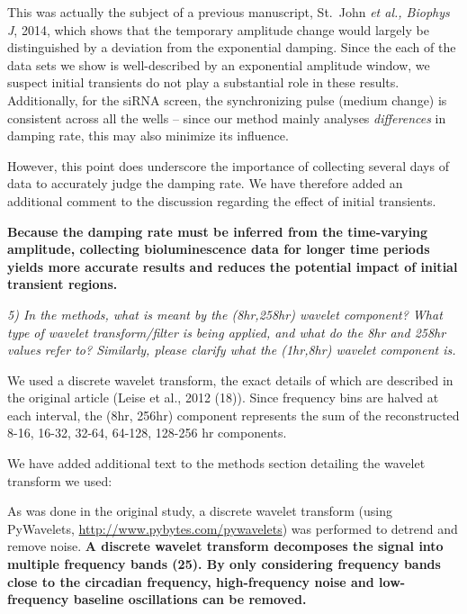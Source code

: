\documentclass[11pt, letterpaper]{article}
\newenvironment{reviewer}{\itshape\color{gray}}{}
\newenvironment{manuscript}[1]{\begin{center}\begin{tcolorbox}[colback=green!5!white,colframe=green!75!black,width=\textwidth,title={#1},breakable,fonttitle=\bfseries]}{\end{tcolorbox}\end{center}}
\begin{document}
This was actually the subject of a previous manuscript, St.\ John {\itshape et al., Biophys J}, 2014, which shows that the temporary amplitude change would largely be distinguished by a deviation from the exponential damping.
Since the each of the data sets we show is well-described by an exponential amplitude window, we suspect initial transients do not play a substantial role in these results.
Additionally, for the siRNA screen, the synchronizing pulse (medium change) is consistent across all the wells -- since our method mainly analyses {\itshape differences} in damping rate, this may also minimize its influence.

However, this point does underscore the importance of collecting several days of data to accurately judge the damping rate. We have therefore added an additional comment to the discussion regarding the effect of initial transients.

\begin{manuscript}{Page 9}
  {\bfseries Because the damping rate must be inferred from the time-varying amplitude, collecting bioluminescence data for longer time periods yields more accurate results and reduces the potential impact of initial transient regions.}
\end{manuscript}

\begin{reviewer}
5) In the methods, what is meant by the (8hr,258hr) wavelet component? What type of wavelet transform/filter is being applied, and what do the 8hr and 258hr values refer to? Similarly, please clarify what the (1hr,8hr) wavelet component is.
\end{reviewer}

We used a discrete wavelet transform, the exact details of which are described in the original article (Leise et al., 2012 (18)).
Since frequency bins are halved at each interval, the (8hr, 256hr) component represents the sum of the reconstructed 8-16, 16-32, 32-64, 64-128, 128-256 hr components.

We have added additional text to the methods section detailing the wavelet transform we used:

\begin{manuscript}{Pages 10}
  As was done in the original study, a discrete wavelet transform (using PyWavelets, \url{http://www.pybytes.com/pywavelets}) was performed to detrend and remove noise. {\bfseries A discrete wavelet transform decomposes the signal into multiple frequency bands (25). By only considering frequency bands close to the circadian frequency, high-frequency noise and low-frequency baseline oscillations can be removed.}
\end{manuscript}
\end{document}
